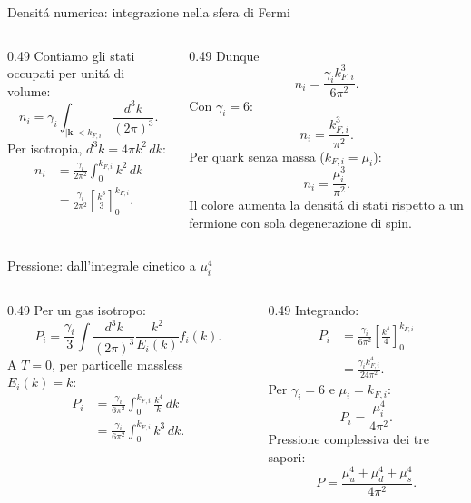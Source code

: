 \begin{frame}[t]{Densit\'a numerica: integrazione nella sfera di Fermi}
\small
\begin{columns}[T,onlytextwidth]
\begin{column}{0.49\textwidth}
Contiamo gli stati occupati per unit\'a di volume:
\[
 n_i=\gamma_i\int_{|\mathbf k|<k_{F,i}}
\frac{d^3k}{(2\pi)^3}.
\]
Per isotropia, $d^3k=4\pi k^2\,dk$:
\[
\begin{aligned}
n_i&=\frac{\gamma_i}{2\pi^2}
\int_0^{k_{F,i}}k^2\,dk\\
&=\frac{\gamma_i}{2\pi^2}
\left[\frac{k^3}{3}\right]_0^{k_{F,i}}.
\end{aligned}
\]
\end{column}
\begin{column}{0.49\textwidth}
Dunque
\[
 n_i=\frac{\gamma_i k_{F,i}^3}{6\pi^2}.
\]
Con $\gamma_i=6$:
\[
 n_i=\frac{k_{F,i}^3}{\pi^2}.
\]
Per quark senza massa ($k_{F,i}=\mu_i$):
\[
\boxed{n_i=\frac{\mu_i^3}{\pi^2}}.
\]
Il colore aumenta la densit\'a di stati rispetto a un fermione con sola degenerazione di spin.
\end{column}
\end{columns}
\end{frame}

\begin{frame}[t]{Pressione: dall'integrale cinetico a $\mu_i^4$}
\small
\begin{columns}[T,onlytextwidth]
\begin{column}{0.49\textwidth}
Per un gas isotropo:
\[
P_i=\frac{\gamma_i}{3}\int\frac{d^3k}{(2\pi)^3}
\frac{k^2}{E_i(k)}f_i(k).
\]
A $T=0$, per particelle massless $E_i(k)=k$:
\[
\begin{aligned}
P_i&=\frac{\gamma_i}{6\pi^2}
\int_0^{k_{F,i}}\frac{k^4}{k}\,dk\\
&=\frac{\gamma_i}{6\pi^2}
\int_0^{k_{F,i}}k^3\,dk.
\end{aligned}
\]
\end{column}
\begin{column}{0.49\textwidth}
Integrando:
\[
\begin{aligned}
P_i&=\frac{\gamma_i}{6\pi^2}
\left[\frac{k^4}{4}\right]_0^{k_{F,i}}\\
&=\frac{\gamma_i k_{F,i}^4}{24\pi^2}.
\end{aligned}
\]
Per $\gamma_i=6$ e $\mu_i=k_{F,i}$:
\[
\boxed{P_i=\frac{\mu_i^4}{4\pi^2}}.
\]
Pressione complessiva dei tre sapori:
\[
P=\frac{\mu_u^4+\mu_d^4+\mu_s^4}{4\pi^2}.
\]
\end{column}
\end{columns}
\end{frame}

